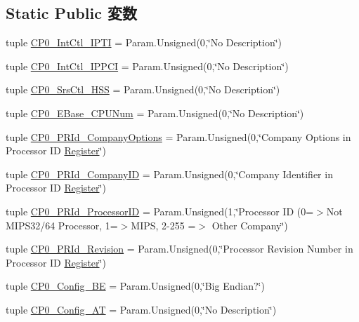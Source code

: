 \subsection*{Static Public 変数}
\begin{DoxyCompactItemize}
\item 
tuple \hyperlink{classMipsCPU_1_1BaseMipsCPU_ac5d8901a8e6d0626eee9ac66c6ecfe44}{CP0\_\-IntCtl\_\-IPTI} = Param.Unsigned(0,\char`\"{}No Description\char`\"{})
\item 
tuple \hyperlink{classMipsCPU_1_1BaseMipsCPU_a6f5844a5323d4b093567bba00d5e8185}{CP0\_\-IntCtl\_\-IPPCI} = Param.Unsigned(0,\char`\"{}No Description\char`\"{})
\item 
tuple \hyperlink{classMipsCPU_1_1BaseMipsCPU_addbd18e7d62b78411929f56220e7d668}{CP0\_\-SrsCtl\_\-HSS} = Param.Unsigned(0,\char`\"{}No Description\char`\"{})
\item 
tuple \hyperlink{classMipsCPU_1_1BaseMipsCPU_ac7fa3f0a56c696086600092a77169097}{CP0\_\-EBase\_\-CPUNum} = Param.Unsigned(0,\char`\"{}No Description\char`\"{})
\item 
tuple \hyperlink{classMipsCPU_1_1BaseMipsCPU_ac6b47ad1af64db771080945a47e0f96f}{CP0\_\-PRId\_\-CompanyOptions} = Param.Unsigned(0,\char`\"{}Company Options in Processor ID \hyperlink{classRegister}{Register}\char`\"{})
\item 
tuple \hyperlink{classMipsCPU_1_1BaseMipsCPU_ad167f6c016fd37b2e5d1919f1ef8fa51}{CP0\_\-PRId\_\-CompanyID} = Param.Unsigned(0,\char`\"{}Company Identifier in Processor ID \hyperlink{classRegister}{Register}\char`\"{})
\item 
tuple \hyperlink{classMipsCPU_1_1BaseMipsCPU_ab88e96bc42511f6884701a8b06c4fff7}{CP0\_\-PRId\_\-ProcessorID} = Param.Unsigned(1,\char`\"{}Processor ID (0=$>$Not MIPS32/64 Processor, 1=$>$MIPS, 2-\/255 =$>$ Other Company\char`\"{})
\item 
tuple \hyperlink{classMipsCPU_1_1BaseMipsCPU_abf8501ad012082959fc56c8b2fe097d8}{CP0\_\-PRId\_\-Revision} = Param.Unsigned(0,\char`\"{}Processor Revision Number in Processor ID \hyperlink{classRegister}{Register}\char`\"{})
\item 
tuple \hyperlink{classMipsCPU_1_1BaseMipsCPU_a6893a0c5c82cdbd1a26d85c8110c96c3}{CP0\_\-Config\_\-BE} = Param.Unsigned(0,\char`\"{}Big Endian?\char`\"{})
\item 
tuple \hyperlink{classMipsCPU_1_1BaseMipsCPU_a98aeda0df7710660961a4813e58eebfc}{CP0\_\-Config\_\-AT} = Param.Unsigned(0,\char`\"{}No Description\char`\"{})
\item 

\end{DoxyCompactItemize}
